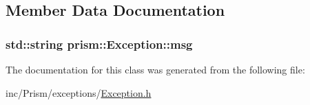 \subsection{Member Data Documentation}
\subsubsection[{\texorpdfstring{msg}{msg}}]{\setlength{\rightskip}{0pt plus 5cm}std\+::string prism\+::\+Exception\+::msg\hspace{0.3cm}{\ttfamily [protected]}}\hypertarget{classprism_1_1_exception_ab768e96bc8a3f617b3420e19a18caf9f}{}\label{classprism_1_1_exception_ab768e96bc8a3f617b3420e19a18caf9f}


The documentation for this class was generated from the following file\+:\begin{DoxyCompactItemize}
\item 
inc/\+Prism/exceptions/\hyperlink{_exception_8h}{Exception.\+h}\end{DoxyCompactItemize}
